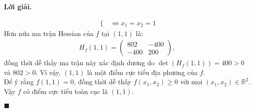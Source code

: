 \documentclass[12pt]{article}
\newcommand{\R}{\mathbb{R}}
\newenvironment{solution}{%
     \setlength\parindent{0pt}\par\medskip\textbf{Lời giải.}\quad}{%
     \hfill\tiny$\blacksquare$\par\medskip}
\begin{document}
\begin{solution}
\begin{enumerate}
\begin{align*}
\begin{cases}
                \end{cases} \Leftrightarrow x_1 = x_2 = 1
            \end{align*}
            Hơn nữa ma trận Hessian của $f$ tại $(1,1)$ là:
            \begin{align*}
                H_f(1,1) = \begin{pmatrix}
                    802 & -400\\
                    -400 & 200
                \end{pmatrix},
            \end{align*}
            đồng thời dễ thấy ma trận này xác định dương do $\det(H_f(1,1)) = 400 > 0$ và $802 > 0$. Vì vậy, $(1,1)$ là một điểm cực tiểu địa phương của $f$.
            \\
            Để ý rằng $f(1, 1) = 0$, đồng thời dễ thấy $f(x_1,x_2) \geq 0$ với mọi $(x_1,x_2) \in \R^2$. Vậy $f$ có điểm cực tiểu toàn cục là $(1,1)$.
        \end{enumerate}
    \end{solution}
\end{document}
